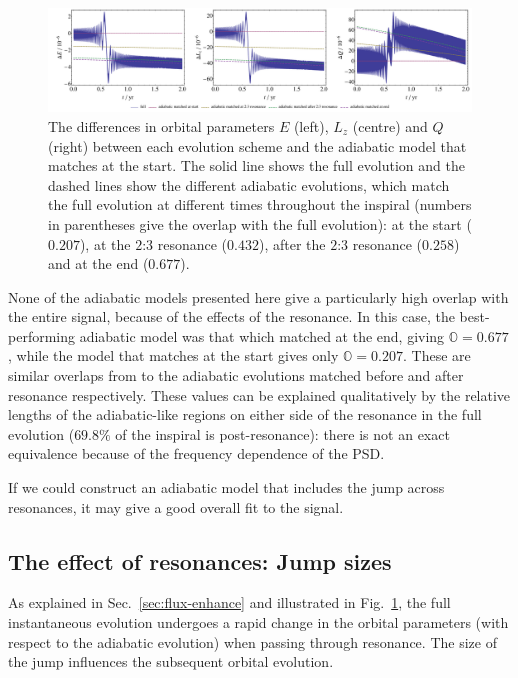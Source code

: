 \documentclass[aps,prd,amsfonts,amssymb,amsmath,nofootinbib,showpacs,superscriptaddress,twocolumn,floatfix]{revtex4-1}
\newcommand{\figref}[1]{Fig.~\ref{fig:#1}}
\newcommand{\secref}[1]{Sec.~\ref{sec:#1}}
\begin{document}
\begin{figure}
\centering
\includegraphics[width=\textwidth]{Fig_res_diff_traj}
\caption{\label{fig:res-diff-traj}The differences in orbital parameters $E$ (left), $L_z$ (centre) and $Q$ (right) between each evolution scheme and the adiabatic model that matches at the start. The solid line shows the full evolution and the dashed lines show the different adiabatic evolutions, which match the full evolution at different times throughout the inspiral (numbers in parentheses give the overlap with the full evolution): at the start ($0.207$), at the $2$:$3$ resonance ($0.432$), after the $2$:$3$ resonance ($0.258$) and at the end ($0.677$).}
\end{figure}

None of the adiabatic models presented here give a particularly high overlap with the entire signal, because of the effects of the resonance. In this case, the best-performing adiabatic model was that which matched at the end, giving $\mathbb{O} = 0.677$, while the model that matches at the start gives only $\mathbb{O} = 0.207$. These are similar overlaps from to the adiabatic evolutions matched before and after resonance respectively. These values can be explained qualitatively by the relative lengths of the adiabatic-like regions on either side of the resonance in the full evolution ($69.8\%$ of the inspiral is post-resonance): there is not an exact equivalence because of the frequency dependence of the PSD.

If we could construct an adiabatic model that includes the jump across resonances, it may give a good overall fit to the signal.

\subsection{The effect of resonances: Jump sizes}
\label{sec:effres-jump}

As explained in \secref{flux-enhance} and illustrated in \figref{res-diff-traj}, the full instantaneous evolution undergoes a rapid change in the orbital parameters (with respect to the adiabatic evolution) when passing through resonance. The size of the jump influences the subsequent orbital evolution.
\end{document}
